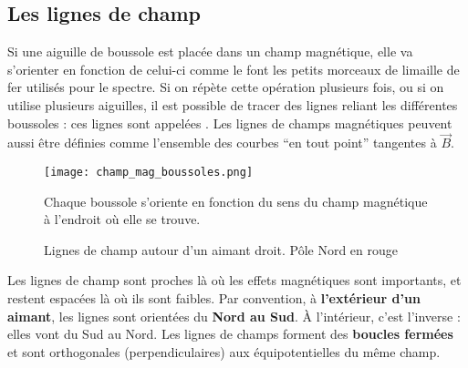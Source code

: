 \subsection{Les lignes de champ}
Si une aiguille de boussole est placée dans un champ magnétique, elle va s'orienter en fonction de celui-ci comme le font les petits morceaux de limaille de fer utilisés pour le spectre. Si on répète cette opération plusieurs fois, ou si on utilise plusieurs aiguilles, il est possible de tracer des lignes reliant les différentes boussoles : ces lignes sont appelées .
Les lignes de champs magnétiques peuvent aussi être définies comme l'ensemble des courbes \enquote{en tout point} tangentes à \(\vec{B}\).

\begin{figure}[h]
    \centering
    \texttt{[image: champ\_mag\_boussoles.png]}
    \caption{Chaque boussole s'oriente en fonction du sens du champ magnétique à l'endroit où elle se trouve.}
    \label{champ_mag_boussole}
\end{figure}

\begin{wrapfigure}[10]{l}{0.5\textwidth}
    \vspace{-\baselineskip}
    \centering
    \resizebox{.9\linewidth}{!}
    {}
    \caption{Lignes de champ autour d'un aimant droit. Pôle Nord en rouge}
    \label{lignes_champ_mag}
\end{wrapfigure}
Les lignes de champ sont proches là où les effets magnétiques sont importants, et restent espacées là où ils sont faibles. Par convention, à \textbf{l'extérieur d'un aimant}, les lignes sont orientées du \textbf{Nord au Sud}. À l'intérieur, c'est l'inverse : elles vont du Sud au Nord. Les lignes de champs forment des \textbf{boucles fermées} et sont orthogonales (perpendiculaires) aux équipotentielles du même champ.

\newpage


